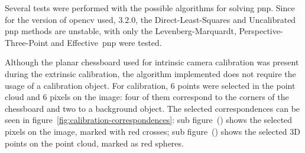 Several tests were performed with the possible algorithms for solving \ac{pnp}. Since for the version of \ac{opencv} used, $3.2.0$, the Direct-Least-Squares and Uncalibrated \ac{pnp} methods are unstable\cite{opencv_doc}, with only the Levenberg-Marquardt, Perspective-Three-Point and Effective~\ac{pnp} were tested. 

Although the planar chessboard used for intrinsic camera calibration was present during the extrinsic calibration, the algorithm implemented does not require the usage of a calibration object. For calibration, 6 points were selected in the point cloud and 6 pixels on the image: four of them correspond to the corners of the chessboard and two to a background object. The selected correspondences can be seen in figure~\ref{fig:calibration-correspondences}: sub figure~() shows the selected pixels on the image, marked with red crosses; sub figure~() shows the selected 3D points on the point cloud, marked as red spheres.


